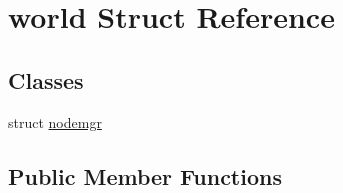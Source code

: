 \hypertarget{structworld}{}\section{world Struct Reference}
\label{structworld}
\subsection*{Classes}
\begin{DoxyCompactItemize}
\item 
struct \hyperlink{structworld_1_1nodemgr}{nodemgr}
\end{DoxyCompactItemize}
\subsection*{Public Member Functions}
